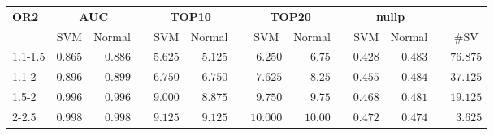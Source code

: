 \documentclass{article}\usepackage[]{graphicx}\usepackage[]{color}
\begin{document}
%
\begin{table}[!tbp]
\begin{center}
\begin{tabular}{lrrcrrcrrcrrcr}
\hline\hline
\multicolumn{1}{l}{\bfseries OR2}&\multicolumn{2}{c}{\bfseries AUC}&\multicolumn{1}{c}{\bfseries }&\multicolumn{2}{c}{\bfseries TOP10}&\multicolumn{1}{c}{\bfseries }&\multicolumn{2}{c}{\bfseries TOP20}&\multicolumn{1}{c}{\bfseries }&\multicolumn{2}{c}{\bfseries nullp}&\multicolumn{1}{c}{\bfseries }&\multicolumn{1}{c}{\bfseries }\tabularnewline
\cline{2-3} \cline{5-6} \cline{8-9} \cline{11-12}
\multicolumn{1}{l}{}&\multicolumn{1}{c}{SVM}&\multicolumn{1}{c}{Normal}&\multicolumn{1}{c}{}&\multicolumn{1}{c}{SVM}&\multicolumn{1}{c}{Normal}&\multicolumn{1}{c}{}&\multicolumn{1}{c}{SVM}&\multicolumn{1}{c}{Normal}&\multicolumn{1}{c}{}&\multicolumn{1}{c}{SVM}&\multicolumn{1}{c}{Normal}&\multicolumn{1}{c}{}&\multicolumn{1}{c}{\#SV}\tabularnewline
\hline
1.1-1.5&$0.865$&$0.886$&&$5.625$&$5.125$&&$ 6.250$&$ 6.75$&&$0.428$&$0.483$&&$76.875$\tabularnewline
1.1-2&$0.896$&$0.899$&&$6.750$&$6.750$&&$ 7.625$&$ 8.25$&&$0.455$&$0.484$&&$37.125$\tabularnewline
1.5-2&$0.996$&$0.996$&&$9.000$&$8.875$&&$ 9.750$&$ 9.75$&&$0.468$&$0.481$&&$19.125$\tabularnewline
2-2.5&$0.998$&$0.998$&&$9.125$&$9.125$&&$10.000$&$10.00$&&$0.472$&$0.474$&&$ 3.625$\tabularnewline
\hline
\end{tabular}
\end{center}
\end{table}
\end{document}
